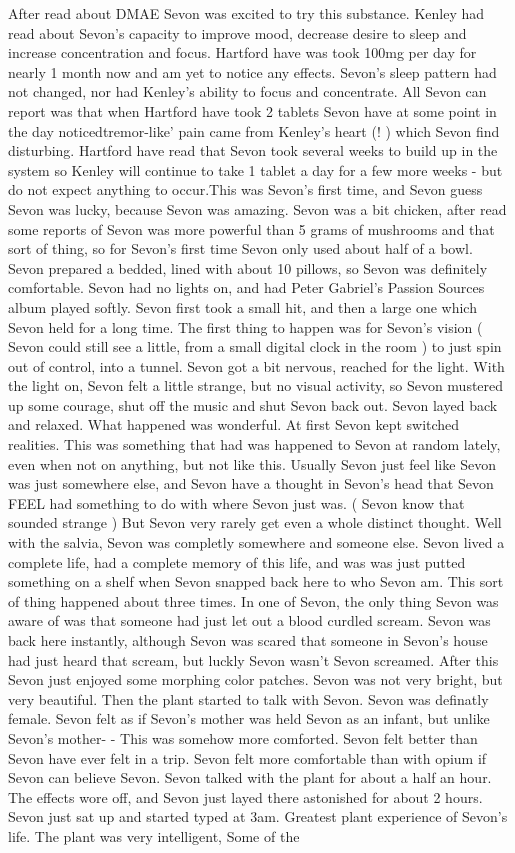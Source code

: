 \documentclass[12pt]{book}
\begin{document}
After read about DMAE Sevon was excited to try this substance. Kenley had read about Sevon's capacity to improve mood, decrease desire to sleep and increase concentration and focus. Hartford have was took 100mg per day for nearly 1 month now and am yet to notice any effects. Sevon's sleep pattern had not changed, nor had Kenley's ability to focus and concentrate. All Sevon can report was that when Hartford have took 2 tablets Sevon have at some point in the day noticedtremor-like' pain came from Kenley's heart (! ) which Sevon find disturbing. Hartford have read that Sevon took several weeks to build up in the system so Kenley will continue to take 1 tablet a day for a few more weeks - but do not expect anything to occur.This was Sevon's first time, and Sevon guess Sevon was lucky, because Sevon was amazing. Sevon was a bit chicken, after read some reports of Sevon was more powerful than 5 grams of mushrooms and that sort of thing, so for Sevon's first time Sevon only used about half of a bowl. Sevon prepared a bedded, lined with about 10 pillows, so Sevon was definitely comfortable. Sevon had no lights on, and had Peter Gabriel's Passion Sources album played softly. Sevon first took a small hit, and then a large one which Sevon held for a long time. The first thing to happen was for Sevon's vision ( Sevon could still see a little, from a small digital clock in the room ) to just spin out of control, into a tunnel. Sevon got a bit nervous, reached for the light. With the light on, Sevon felt a little strange, but no visual activity, so Sevon mustered up some courage, shut off the music and shut Sevon back out. Sevon layed back and relaxed. What happened was wonderful. At first Sevon kept switched realities. This was something that had was happened to Sevon at random lately, even when not on anything, but not like this. Usually Sevon just feel like Sevon was just somewhere else, and Sevon have a thought in Sevon's head that Sevon FEEL had something to do with where Sevon just was. ( Sevon know that sounded strange ) But Sevon very rarely get even a whole distinct thought. Well with the salvia, Sevon was completly somewhere and someone else. Sevon lived a complete life, had a complete memory of this life, and was was just putted something on a shelf when Sevon snapped back here to who Sevon am. This sort of thing happened about three times. In one of Sevon, the only thing Sevon was aware of was that someone had just let out a blood curdled scream. Sevon was back here instantly, although Sevon was scared that someone in Sevon's house had just heard that scream, but luckly Sevon wasn't Sevon screamed. After this Sevon just enjoyed some morphing color patches. Sevon was not very bright, but very beautiful. Then the plant started to talk with Sevon. Sevon was definatly female. Sevon felt as if Sevon's mother was held Sevon as an infant, but unlike Sevon's mother- - This was somehow more comforted. Sevon felt better than Sevon have ever felt in a trip. Sevon felt more comfortable than with opium if Sevon can believe Sevon. Sevon talked with the plant for about a half an hour. The effects wore off, and Sevon just layed there astonished for about 2 hours. Sevon just sat up and started typed at 3am. Greatest plant experience of Sevon's life. The plant was very intelligent, Some of the 
\end{document}
